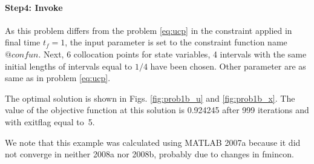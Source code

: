 \paragraph{Step4: Invoke~}

{\small }

As this problem differs from the problem \eqref{eq:ucp} in the
constraint applied in final time $t_{f} = 1$, the input parameter
 is set to the constraint function name
$@confun$. Next, 6 collocation points for state variables, 4 intervals
with the same initial lengths of intervals equal to $1/4$ have been
chosen. Other parameter are as same as in problem \eqref{eq:ucp}.

The optimal solution is shown in Figs. \ref{fig:prob1b_u} and
\ref{fig:prob1b_x}. The value of the objective function at this
solution is 0.924245 after 999 iterations and with exitflag equal to~5. 

We note that this example was calculated using MATLAB 2007a because
it did not converge in neither 2008a nor 2008b, probably due to changes
in fmincon. 

